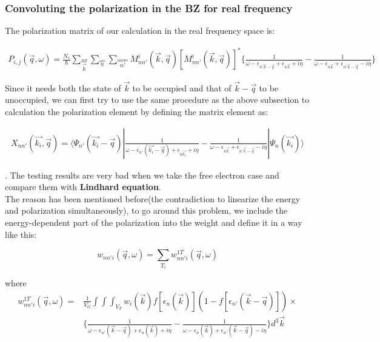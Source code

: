 \documentclass[10pt]{article}
\begin{document}
\subsubsection{Convoluting the polarization in the BZ for real frequency}

The polarization matrix of our calculation in the real frequency space is:

\begin{eqnarray} 
P_{i,j}(\vec{q},\omega)=\frac{N_c}{\hbar}\sum\limits_{\vec{k}}\limits^{BZ}\sum\limits_{n}\limits^{occ}\sum\limits_{n'}\limits^{unocc}M_{nn'}^{i}(\vec{k},\vec{q})[M_{nn'}^{i}(\vec{k},\vec{q})]^{*}\{\frac{1}{\omega-\epsilon_{n'\vec{k}-\vec{q}}+\epsilon_{n\vec{k}}+i\eta}-\frac{1}{\omega-\epsilon_{n\vec{k}}+\epsilon_{n'\vec{k}-\vec{q}}-i\eta}\}
\label{polarizamatrix}
\end{eqnarray}

Since it needs both the state of $\vec{k}$ to be occupied and that of $\vec{k}-\vec{q}$ to be unoccupied, we can first try to use the same procedure as the above subsection to calculation the polarization element by defining the matrix element as:

\begin{eqnarray}
X_{nn'}(\vec{k_{i}},\vec{q})=\langle \Psi_{n'}(\vec{k_{i}}-\vec{q})|\frac{1}{\omega-\epsilon_{n'}(\vec{k_i}-\vec{q})+\epsilon_{n\vec{k_i}}+i\eta}-\frac{1}{\omega-\epsilon_{n\vec{k}}+\epsilon_{n'\vec{k}-\vec{q}}-i\eta} |\Psi_{n}(\vec{k_i}) \rangle
\label{matrelem}
\end{eqnarray}

. The testing results are very bad when we take the free electron case and compare them with \textbf{Lindhard equation}.\\


The reason has been mentioned before(the contradiction to linearize the energy and polarization simultaneously), to go around this problem, we include the energy-dependent part of the polarization into the weight and define it in a way like this: 

\begin{equation}
w_{nn'i}(\vec{q},\omega)=\sum\limits_{T_i}w_{nn'i}^{1T}(\vec{q},\omega)
\label{wtofki}
\end{equation} 

where
\begin{eqnarray}\label{wtofkiT}
{w_{nn'i}^{1T}}(\vec{q},\omega)=&\frac{1}{V_G}
\int\int\int_{V_T}w_i(\vec{k})f[\epsilon_n(\vec{k})](1-f[\epsilon_{n'}(\vec{k}-\vec{q})])\times
\nonumber\\
&\{\frac{1}{\omega-\epsilon_{n'}(\vec{k}-\vec{q})+\epsilon_{n}(\vec{k})+i\eta}-\frac{1}{\omega-\epsilon_{n}(\vec{k})+\epsilon_{n'}(\vec{k}-\vec{q})-i\eta}\}d^3\vec{k}	
\end{eqnarray}
\end{document}
